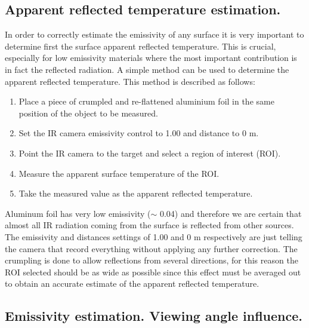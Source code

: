 		\subsection{Apparent reflected temperature estimation.}\label{section3.1.1}
		
			In order to correctly estimate the emissivity of any surface it is very important to determine first the surface apparent reflected temperature. This is crucial, especially for low emissivity materials where the most important contribution is in fact the reflected radiation.
			A simple method can be used to determine the apparent reflected temperature. This method is described as follows:
			
			\begin{enumerate}[label={\arabic*)}]
				\item Place a piece of crumpled and re-flattened aluminium foil in the same position of the object to be measured.
				\item Set the IR camera emissivity control to 1.00 and distance to 0 m.
				\item Point the IR camera to the target and select a region of interest (ROI).
				\item Measure the apparent surface temperature of the ROI.
				\item Take the measured value as the apparent reflected temperature.
			\end{enumerate}
			
			Aluminum foil has very low emissivity ($\sim$ 0.04) and therefore we are certain that almost all IR radiation coming from the surface is reflected from other sources. The emissivity and distances settings of 1.00 and 0 m respectively are just telling the camera that record everything without applying any further correction. The crumpling is done to allow reflections from several directions, for this reason the ROI selected should be as wide as possible since this effect must be averaged out to obtain an accurate estimate of the apparent reflected temperature.
	
		\subsection{Emissivity estimation. Viewing angle influence.}\label{section3.1.2}
		
